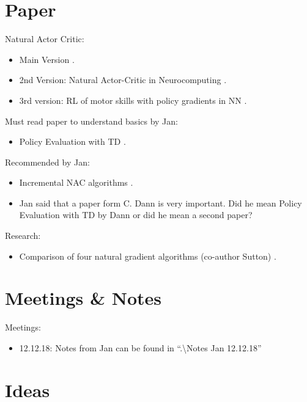 \documentclass{article}
\begin{document}
\newpage
\section{Paper}
Natural Actor Critic:
\begin{itemize}
	\item Main Version \cite{peters2005natural}.
	\item 2nd Version: Natural Actor-Critic in Neurocomputing \cite{peters2008natural}.
	\item 3rd version: RL of motor skills with policy gradients in NN \cite{peters2008reinforcement}.
\end{itemize}

\noindent Must read paper to understand basics by Jan:
\begin{itemize}
	\item Policy Evaluation with TD \cite{dann2014policy}.
\end{itemize}

\noindent Recommended by Jan:
\begin{itemize}
	\item Incremental NAC algorithms \cite{bhatnagar2008incremental}.
	\item Jan said that a paper form C. Dann is very important. Did he mean Policy Evaluation with TD by Dann or did he mean a second paper?
\end{itemize}

\noindent Research:
\begin{itemize}
	\item Comparison of four natural gradient algorithms (co-author Sutton) \cite{bhatnagar2009natural}.
\end{itemize}

\section{Meetings \& Notes}

Meetings:
\begin{itemize}
	\item 12.12.18: Notes from Jan can be found in ``.\textbackslash Notes Jan 12.12.18''
\end{itemize}


\section{Ideas}
\end{document}
